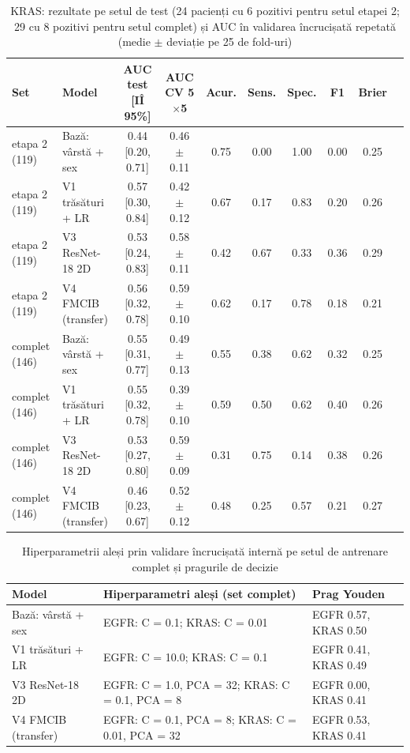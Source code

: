 \begin{table}[htbp]
\centering
\scriptsize
\setlength{\tabcolsep}{3pt}
\begin{tabular}{llcccccccc}
\toprule
\textbf{Set} & \textbf{Model} & \textbf{AUC test [IÎ 95\%]} & \textbf{AUC CV 5$\times$5} & \textbf{Acur.} & \textbf{Sens.} & \textbf{Spec.} & \textbf{F1} & \textbf{Brier} \\
\midrule
etapa 2 (119) & Bază: vârstă + sex & 0.44 [0.20, 0.71] & 0.46 $\pm$ 0.11 & 0.75 & 0.00 & 1.00 & 0.00 & 0.25 \\
etapa 2 (119) & V1 trăsături + LR & 0.57 [0.30, 0.84] & 0.42 $\pm$ 0.12 & 0.67 & 0.17 & 0.83 & 0.20 & 0.26 \\
etapa 2 (119) & V3 ResNet-18 2D & 0.53 [0.24, 0.83] & 0.58 $\pm$ 0.11 & 0.42 & 0.67 & 0.33 & 0.36 & 0.29 \\
etapa 2 (119) & V4 FMCIB (transfer) & 0.56 [0.32, 0.78] & 0.59 $\pm$ 0.10 & 0.62 & 0.17 & 0.78 & 0.18 & 0.21 \\
\midrule
complet (146) & Bază: vârstă + sex & 0.55 [0.31, 0.77] & 0.49 $\pm$ 0.13 & 0.55 & 0.38 & 0.62 & 0.32 & 0.25 \\
complet (146) & V1 trăsături + LR & 0.55 [0.32, 0.78] & 0.39 $\pm$ 0.10 & 0.59 & 0.50 & 0.62 & 0.40 & 0.26 \\
complet (146) & V3 ResNet-18 2D & 0.53 [0.27, 0.80] & 0.59 $\pm$ 0.09 & 0.31 & 0.75 & 0.14 & 0.38 & 0.26 \\
complet (146) & V4 FMCIB (transfer) & 0.46 [0.23, 0.67] & 0.52 $\pm$ 0.12 & 0.48 & 0.25 & 0.57 & 0.21 & 0.27 \\
\bottomrule
\end{tabular}
\caption{KRAS: rezultate pe setul de test (24 pacienți cu 6 pozitivi pentru setul etapei 2; 29 cu 8 pozitivi pentru setul complet) și AUC în validarea încrucișată repetată (medie $\pm$ deviație pe 25 de fold-uri)}
\label{tab:s3_kras}
\end{table}
\begin{table}[htbp]
\centering
\scriptsize
\begin{tabular}{lp{}l}
\toprule
\textbf{Model} & \textbf{Hiperparametri aleși (set complet)} & \textbf{Prag Youden} \\
\midrule
Bază: vârstă + sex & EGFR: C = 0.1; KRAS: C = 0.01 & EGFR 0.57, KRAS 0.50 \\
V1 trăsături + LR & EGFR: C = 10.0; KRAS: C = 0.1 & EGFR 0.41, KRAS 0.49 \\
V3 ResNet-18 2D & EGFR: C = 1.0, PCA = 32; KRAS: C = 0.1, PCA = 8 & EGFR 0.00, KRAS 0.41 \\
V4 FMCIB (transfer) & EGFR: C = 0.1, PCA = 8; KRAS: C = 0.01, PCA = 32 & EGFR 0.53, KRAS 0.41 \\
\bottomrule
\end{tabular}
\caption{Hiperparametrii aleși prin validare încrucișată internă pe setul de antrenare complet și pragurile de decizie}
\label{tab:s3_param}
\end{table}

